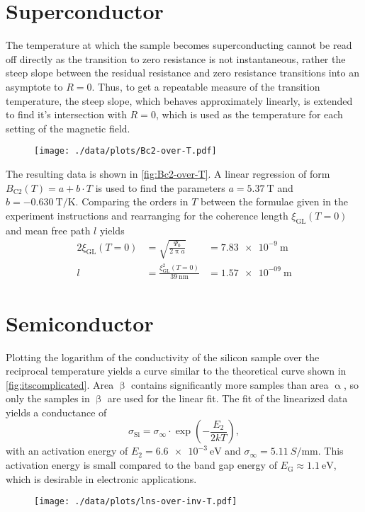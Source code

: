 \section{Superconductor}
The temperature at which the sample becomes superconducting cannot be read off directly as the transition to zero resistance is not instantaneous, rather the steep slope between the residual resistance and zero resistance transitions into an asymptote to $R = 0$.
Thus, to get a repeatable measure of the transition temperature, the steep slope, which behaves approximately linearly, is extended to find it's intersection with $R = 0$, which is used as the temperature for each setting of the magnetic field.
\begin{figure}
	\centering
	\texttt{[image: ./data/plots/Bc2-over-T.pdf]}
	\label{fig:Bc2-over-T}
\end{figure}
The resulting data is shown in \autoref{fig:Bc2-over-T}.
A linear regression of form $B_\text{C2}(T) = a + b \cdot T$ is used to find the parameters $a = \SI{5.37}{\tesla}$ and $b = \SI{-0.630}{\tesla\per\kelvin}$.
Comparing the orders in $T$ between the formulae given in the experiment instructions and rearranging for the coherence length $\xi_\text{GL}(T = 0)$ and mean free path $l$ yields
\begin{alignat*}{2}
	\xi_\text{GL}(T = 0) &= \sqrt{\frac{\Psi_0}{2 \uppi a}} &= \SI{7.83e-9}{\meter}\\
	l &= \frac{\xi^2_\text{GL}(T = 0)}{\SI{39}{\nano\meter}} &= \SI{1.57e-09}{\meter}
\end{alignat*}

\section{Semiconductor}
Plotting the logarithm of the conductivity of the silicon sample over the reciprocal temperature yields a curve similar to the theoretical curve shown in \autoref{fig:itscomplicated}.
Area $\upbeta$ contains significantly more samples than area $\upalpha$, so only the samples in $\upbeta$ are used for the linear fit.
The fit of the linearized data yields a conductance of
\begin{equation*}
	\sigma_\text{Si} = \sigma_\infty \cdot \exp\left(- \frac{E_2}{2 k T}\right),
\end{equation*}
with an activation energy of $E_2 = \SI{6.6e-3}{\eV}$ and $\sigma_\infty = \SI{5.11}{S\per\milli\meter}$.
This activation energy is small compared to the band gap energy of $E_\text{G} \approx \SI{1.1}{\eV}$, which is desirable in electronic applications.

\begin{figure}
	\centering
	\texttt{[image: ./data/plots/lns-over-inv-T.pdf]}
	\label{fig:lns-over-inv-T}
\end{figure}

